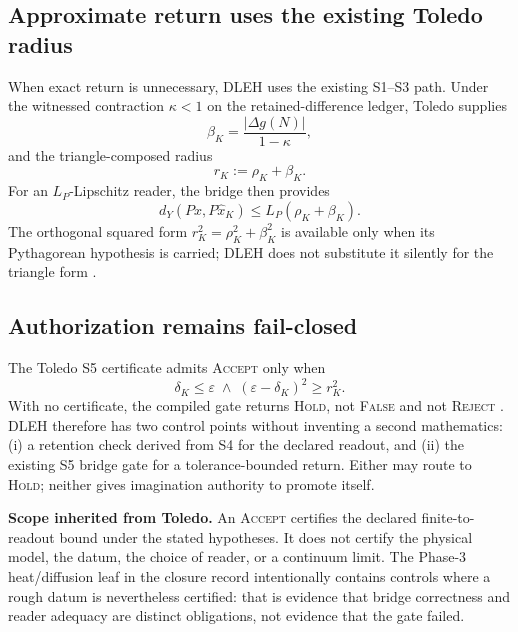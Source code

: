 \documentclass[10pt,twocolumn]{article}
\begin{document}
\subsection{Approximate return uses the existing Toledo radius}
When exact return is unnecessary, DLEH uses the existing S1--S3 path. Under the witnessed contraction $\kappa < 1$ on the retained-difference ledger, Toledo supplies
\begin{equation}
\beta_K = \frac{|\Delta g(N)|}{1-\kappa},
\end{equation}
and the triangle-composed radius
\begin{equation}
r_K := \rho_K + \beta_K.
\end{equation}
For an $L_P$-Lipschitz reader, the bridge then provides
\begin{equation}
d_Y(Px, P\hat x_K) \le L_P (\rho_K + \beta_K).
\end{equation}
The orthogonal squared form $r_K^2 = \rho_K^2 + \beta_K^2$ is available only when its Pythagorean hypothesis is carried; DLEH does not substitute it silently for the triangle form \cite{lahtee2026toledo}.

\subsection{Authorization remains fail-closed}
The Toledo S5 certificate admits \textsc{Accept} only when
\begin{equation}
\delta_K \le \varepsilon \; \wedge \; (\varepsilon - \delta_K)^2 \ge r_K^2.
\end{equation}
With no certificate, the compiled gate returns \textsc{Hold}, not \textsc{False} and not \textsc{Reject} \cite{lahtee2026toledo}. DLEH therefore has two control points without inventing a second mathematics: (i) a retention check derived from S4 for the declared readout, and (ii) the existing S5 bridge gate for a tolerance-bounded return. Either may route to \textsc{Hold}; neither gives imagination authority to promote itself.

\begin{corebox}
\textbf{Scope inherited from Toledo.} An \textsc{Accept} certifies the declared finite-to-readout bound under the stated hypotheses. It does not certify the physical model, the datum, the choice of reader, or a continuum limit. The Phase-3 heat/diffusion leaf in the closure record intentionally contains controls where a rough datum is nevertheless certified: that is evidence that bridge correctness and reader adequacy are distinct obligations, not evidence that the gate failed.
\end{corebox}
\end{document}
